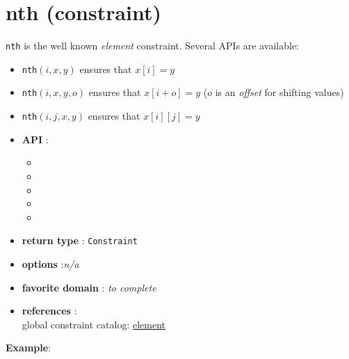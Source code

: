 \label{nth}
\hypertarget{nth}{}

\section{nth (constraint)}\label{nth:nthconstraint}\hypertarget{nth:nthconstraint}{}
\texttt{nth} is the well known \emph{element} constraint.
Several APIs are available: 
\begin{notedef}
\begin{itemize}
\item \texttt{nth}$(i,x,y)$ ensures that $x[i]=y$
\item \texttt{nth}$(i,x,y,o)$ ensures that $x[i+o]=y$ ($o$ is an \emph{offset} for shifting values)
\item \texttt{nth}$(i,j,x,y)$ ensures that $x[i][j]=y$
\end{itemize}
\end{notedef}

\begin{itemize}
	\item \textbf{API} :
	\begin{itemize}
		\item {}
		\item {}
		\item {}
		\item {}
		\item {}
	\end{itemize}
	\item \textbf{return type} : \texttt{Constraint}
	\item \textbf{options} :\emph{n/a}
	\item \textbf{favorite domain} : \emph{to complete}
	\item \textbf{references} :\\
      global constraint catalog: \href{http://www.emn.fr/x-info/sdemasse/gccat/Celement.html}{element}
\end{itemize}

\textbf{Example}:
 
